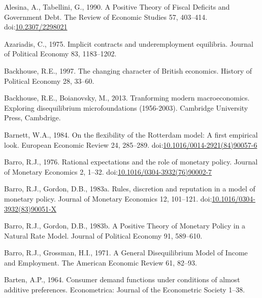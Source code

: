 \documentclass[
  12pt,
  onecolumn]{article}
\newlength{\cslhangindent}
\newlength{\cslentryspacingunit} %
\newenvironment{CSLReferences}[2] %
 {%
  \setlength{\parindent}{0pt}
  \ifodd #1
  \let\oldpar\par
  \def\par{\hangindent=\cslhangindent\oldpar}
  \fi
  \setlength{\parskip}{#2\cslentryspacingunit}
 }%
 {}
\begin{document}
\hypertarget{refs}{}
\begin{CSLReferences}{1}{0}
\leavevmode{}%
Alesina, A., Tabellini, G., 1990. A {Positive Theory} of {Fiscal Deficits} and {Government Debt}. The Review of Economic Studies 57, 403--414. doi:\href{https://doi.org/10.2307/2298021}{10.2307/2298021}

\leavevmode{}%
Azariadis, C., 1975. Implicit contracts and underemployment equilibria. Journal of Political Economy 83, 1183--1202.

\leavevmode{}%
Backhouse, R.E., 1997. The changing character of {British} economics. History of Political Economy 28, 33--60.

\leavevmode{}%
Backhouse, R.E., Boianovsky, M., 2013. Tranforming modern macroeconomics. {Exploring} disequilibrium microfoundations (1956-2003). {Cambridge University Press}, {Cambdrige}.

\leavevmode{}%
Barnett, W.A., 1984. On the flexibility of the {Rotterdam} model: {A} first empirical look. European Economic Review 24, 285--289. doi:\href{https://doi.org/10.1016/0014-2921(84)90057-6}{10.1016/0014-2921(84)90057-6}

\leavevmode{}%
Barro, R.J., 1976. Rational expectations and the role of monetary policy. Journal of Monetary Economics 2, 1--32. doi:\href{https://doi.org/10.1016/0304-3932(76)90002-7}{10.1016/0304-3932(76)90002-7}

\leavevmode{}%
Barro, R.J., Gordon, D.B., 1983a. Rules, discretion and reputation in a model of monetary policy. Journal of Monetary Economics 12, 101--121. doi:\href{https://doi.org/10.1016/0304-3932(83)90051-X}{10.1016/0304-3932(83)90051-X}

\leavevmode{}%
Barro, R.J., Gordon, D.B., 1983b. A {Positive Theory} of {Monetary Policy} in a {Natural Rate Model}. Journal of Political Economy 91, 589--610.

\leavevmode{}%
Barro, R.J., Grossman, H.I., 1971. A {General Disequilibrium Model} of {Income} and {Employment}. The American Economic Review 61, 82--93.

\leavevmode{}%
Barten, A.P., 1964. Consumer demand functions under conditions of almost additive preferences. Econometrica: Journal of the Econometric Society 1--38.


\end{CSLReferences}
\end{document}
